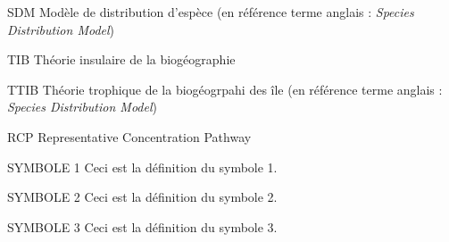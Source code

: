 \listeabrev
\begin{liste}

\item[SDM] Modèle de distribution d'espèce (en référence terme anglais : \textit{Species Distribution Model})

\item[TIB] Théorie insulaire de la biogéographie

\item[TTIB] Théorie trophique de la biogéogrpahi des île (en référence terme anglais : \textit{Species Distribution Model})

\item[RCP]  Representative Concentration Pathway
\end{liste}


\listesymboles
\begin{liste}
\item[SYMBOLE 1] Ceci est la définition du symbole 1.

\item[SYMBOLE 2] Ceci est la définition du symbole 2.

\item[SYMBOLE 3] Ceci est la définition du symbole 3.
\end{liste}


\cleardoublepage
